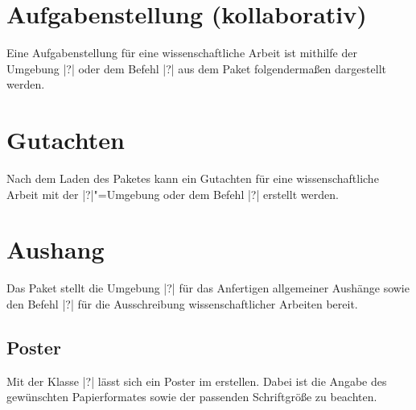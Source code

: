 \begin{Bundle}{}
\section{Aufgabenstellung (kollaborativ)}
%
%
%
%
Eine Aufgabenstellung für eine wissenschaftliche Arbeit ist mithilfe der 
Umgebung |?| oder dem Befehl |?| aus dem 
Paket  folgendermaßen dargestellt werden.

\section{Gutachten}
%
%
%
Nach dem Laden des Paketes  kann ein Gutachten für 
eine wissenschaftliche Arbeit mit der |?|"=Umgebung 
oder dem Befehl |?| erstellt werden.

\section{Aushang}
%
%
%
Das Paket  stellt die Umgebung |?|
für das Anfertigen allgemeiner Aushänge sowie den Befehl |?|
für die Ausschreibung wissenschaftlicher Arbeiten bereit.
\end{Bundle}

\begin{Bundle}{}
\section{Poster}
%
%
%
Mit der Klasse |?| lässt sich ein Poster im \TUDCD 
erstellen. Dabei ist die Angabe des gewünschten Papierformates sowie der 
passenden Schriftgröße zu beachten.
%
\end{Bundle}




